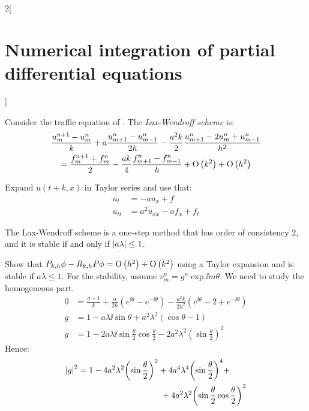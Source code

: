\documentclass[../../../main_math.tex]{subfiles}
\begin{document}
\begin{multicols}{2}[\section{Numerical integration of partial differential equations}]
\begin{proposition}
\begin{itemize}
    \end{itemize}
  \end{proposition}
  \begin{proposition}
    Consider the traffic equation of .
    The \emph{Lax-Wendroff scheme} is:
    \begin{multline*}
      \frac{u_m^{n+1}-u_{m}^n}{k}+a\frac{u_{m+1}^{n}-u_{m-1}^n}{2h}-\frac{a^2k}{2}\frac{u_{m+1}^n-2u_m^n+u_{m-1}^n}{h^2} \\ =\frac{f_m^{n+1}+f_m^n}{2}-\frac{ak}{4}\frac{f_{m+1}^n-f_{m-1}^n}{h}+\mathrm{O}\left(k^2\right)+\mathrm{O}\left(h^2\right)
    \end{multline*}
  \end{proposition}
  \begin{sproof}
    Expand $u(t+k,x)$ in Taylor series and use that:
    \begin{align*}
      u_t    & =-au_x+f            \\
      u_{tt} & =a^2u_{xx}-af_x+f_t
    \end{align*}
  \end{sproof}
  \begin{proposition}
    The Lax-Wendroff scheme is a one-step method that has order of consistency 2, and it is stable if and only if $\abs{a\lambda} \leq 1$.
  \end{proposition}
  \begin{sproof}
    Show that $P_{k,h}\phi-R_{k,h}P\phi=\mathrm{O}\left(h^2\right)+\mathrm{O}\left(k^2\right)$ using a Taylor expansion and is stable if $a\lambda\leq 1$. For the stability, assume $v_m^n=g^n\exp{\ii m\theta}$. We need to study the homogeneous part.
    \begin{align*}
      0 & =\frac{g-1}{k}+\frac{a}{2h}\left(e^{\ii\theta}-e^{-\ii\theta}\right)-\frac{a^2k}{2h^2}\left(e^{\ii\theta}-2+e^{-\ii\theta}\right) \\
      g & = 1-a\lambda\ii\sin\theta+a^2\lambda^2(\cos\theta-1)                                                                              \\
      g & = 1-2a\lambda\ii\sin\frac{\theta}{2}\cos\frac{\theta}{2} -2a^2\lambda^2{\left(\sin\frac{\theta}{2}\right)}^2
    \end{align*}
    Hence:
    \begin{align*}
      \begin{split}
        \abs{g}^2&=1-4a^2\lambda^2 {\left(\sin\frac{\theta}{2} \right)}^2+4a^4\lambda^4{\left(\sin\frac{\theta}{2}\right)}^4+\\
        &\hspace{3.5cm}+4a^2\lambda^2{\left(\sin\frac{\theta}{2}\cos\frac{\theta}{2}\right)}^2

\end{split}
\end{align*}
\end{sproof}
\end{multicols}
\end{document}
